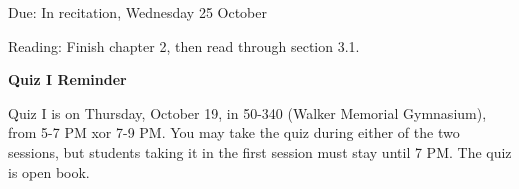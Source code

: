 % 
% 
% 
% 
% 
% 




\def\resistor{$\wedge\wedge\wedge\wedge$}




\medskip

\begin{flushleft}
Due: In recitation, Wednesday 25 October

Reading: Finish chapter 2, then read through section 3.1.
\end{flushleft}

\mbox{}\hrulefill\mbox{}

\begin{center}
{\bf Quiz I Reminder}
\end{center}

Quiz I is on Thursday, October 19, in 50-340 (Walker Memorial Gymnasium), from
5-7 PM xor 7-9 PM.  You may take the quiz during either of the two sessions,
but students taking it in the first session must stay until 7 PM.  The quiz is
open book.

